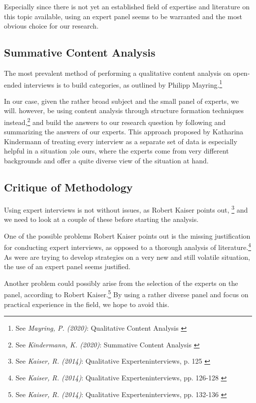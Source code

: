 Especially since there is not yet an established field of expertise and literature on this topic available, using an expert panel seems to be warranted and the most obvious choice for our research.

\subsection{Summative Content Analysis} 

The most prevalent method of performing a qualitative content analysis on open-ended interviews is to build categories, as outlined by Philipp Mayring.\footnote{See \textit{Mayring, P. (2020)}: Qualitative Content Analysis \cite{qualiContent}}

In our case, given the rather broad subject and the small panel of experts, we will. however, be using content analysis through structure formation techniques instead,\footnote{See \textit{Kindermann, K. (2020)}: Summative Content Analysis \cite{summaContent}} and build the answers to our research question by following and summarizing the answers of our experts. This approach proposed by Katharina Kindermann of treating every interview as a separate set of data is especially helpful in a situation ;ole ours, where the experts come from very different backgrounds and offer a quite diverse view of the situation at hand.

\subsection{Critique of Methodology}

Using expert interviews is not without issues, as Robert Kaiser points out, \footnote{See \textit{Kaiser, R. (2014)}: Qualitative Experteninterviews, p. 125 \cite{expertInterviews}} and we need to look at a couple of these before starting the analysis.

One of the possible problems Robert Kaiser points out is the missing justification for conducting expert interviews, as opposed to a thorough analysis of literature.\footnote{See \textit{Kaiser, R. (2014)}: Qualitative Experteninterviews, pp. 126-128 \cite{expertInterviews}} As were are trying to develop strategies on a very new and still volatile situation, the use of an expert panel seems justified.

Another problem could possibly arise from the selection of the experts on the panel, according to Robert Kaiser.\footnote{See \textit{Kaiser, R. (2014)}: Qualitative Experteninterviews, pp. 132-136 \cite{expertInterviews}} By using a rather diverse panel and focus on practical experience in the field, we hope to avoid this.

